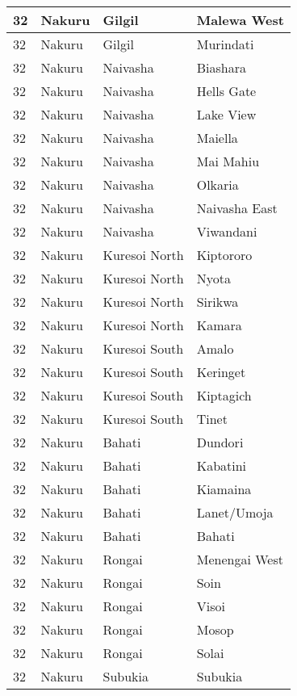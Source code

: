 \begin{table}[!ht]
\begin{tabular}{|l|l|l|l|}
        32 & Nakuru & Gilgil & Malewa West \\ \hline
        32 & Nakuru & Gilgil & Murindati \\ \hline
        32 & Nakuru & Naivasha & Biashara \\ \hline
        32 & Nakuru & Naivasha & Hells Gate \\ \hline
        32 & Nakuru & Naivasha & Lake View \\ \hline
        32 & Nakuru & Naivasha & Maiella \\ \hline
        32 & Nakuru & Naivasha & Mai Mahiu \\ \hline
        32 & Nakuru & Naivasha & Olkaria \\ \hline
        32 & Nakuru & Naivasha & Naivasha East \\ \hline
        32 & Nakuru & Naivasha & Viwandani \\ \hline
        32 & Nakuru & Kuresoi North & Kiptororo \\ \hline
        32 & Nakuru & Kuresoi North & Nyota \\ \hline
        32 & Nakuru & Kuresoi North & Sirikwa \\ \hline
        32 & Nakuru & Kuresoi North & Kamara \\ \hline
        32 & Nakuru & Kuresoi South & Amalo \\ \hline
        32 & Nakuru & Kuresoi South & Keringet \\ \hline
        32 & Nakuru & Kuresoi South & Kiptagich \\ \hline
        32 & Nakuru & Kuresoi South & Tinet \\ \hline
        32 & Nakuru & Bahati & Dundori \\ \hline
        32 & Nakuru & Bahati & Kabatini \\ \hline
        32 & Nakuru & Bahati & Kiamaina \\ \hline
        32 & Nakuru & Bahati & Lanet/Umoja \\ \hline
        32 & Nakuru & Bahati & Bahati \\ \hline
        32 & Nakuru & Rongai & Menengai West \\ \hline
        32 & Nakuru & Rongai & Soin \\ \hline
        32 & Nakuru & Rongai & Visoi \\ \hline
        32 & Nakuru & Rongai & Mosop \\ \hline
        32 & Nakuru & Rongai & Solai \\ \hline
        32 & Nakuru & Subukia & Subukia \\ \hline

\end{tabular}
\end{table}
